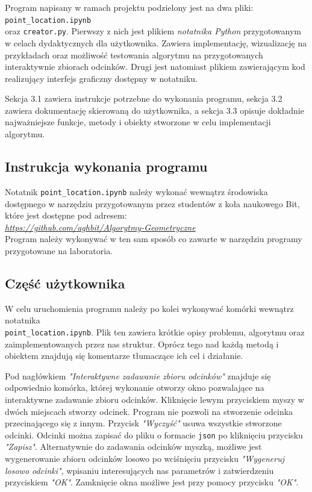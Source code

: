 \documentclass[11pt,a4paper]{article}
\begin{document}
Program napisany w ramach projektu podzielony jest
na dwa pliki: \verb|point_location.ipynb| \\
oraz \verb|creator.py|. Pierwszy z nich jest plikiem
\textit{notatnika Python} przygotowanym w celach dydaktycznych
dla użytkownika. Zawiera implementację, wizualizację na przykładach 
oraz możliwość testowania algorytmu na przygotowanych interaktywnie
zbiorach odcinków. Drugi jest natomiast plikiem
zawierającym kod realizujący interfejs graficzny dostępny w notatniku.

Sekcja 3.1 zawiera instrukcje potrzebne do wykonania programu,
sekcja 3.2 zawiera dokumentację skierowaną do użytkownika, %
a sekcja 3.3 opisuje dokładnie najważniejsze funkcje, metody
i obiekty stworzone w celu implementacji algorytmu.

\subsection{Instrukcja wykonania programu}
Notatnik \verb|point_location.ipynb| należy wykonać
wewnątrz środowiska dostępnego w narzędziu 
przygotowanym przez studentów z koła naukowego Bit, 
które jest dostępne pod adresem:
\\
\emph{\hyperlink{https://github.com/aghbit/Algorytmy-Geometryczne}
{https://github.com/aghbit/Algorytmy-Geometryczne}}
\\
Program należy wykonywać w ten sam sposób co
zawarte w narzędziu programy przygotowane na laboratoria.

\subsection{Część użytkownika}
W celu uruchomienia programu należy po kolei
wykonywać komórki wewnątrz notatnika \\
\verb|point_location.ipynb|. Plik ten zawiera
krótkie opisy problemu, algorytmu oraz zaimplementowanych
przez nas struktur. Oprócz tego nad każdą metodą i obiektem
znajdują się komentarze tłumaczące ich cel i działanie.

Pod nagłówkiem \emph{"Interaktywne zadawanie zbioru odcinków"}
znajduje się odpowiednio komórka, której wykonanie otworzy
okno pozwalające na interaktywne zadawanie zbioru odcinków.
Kliknięcie lewym przyciskiem myszy w dwóch miejscach stworzy odcinek. 
Program nie pozwoli na stworzenie odcinka przecinającego się z innym.
Przycisk \emph{"Wyczyść"} usuwa wszystkie stworzone odcinki.
Odcinki można zapisać do pliku o formacie \verb|json| po kliknięciu
przycisku \emph{"Zapisz"}. Alternatywnie do zadawania odcinków myszką,
możliwe jest wygenerowanie zbioru odcinków losowo po wciśnięciu
przycisku \emph{"Wygeneruj losowo odcinki"}, wpisaniu interesujących
nas parametrów i zatwierdzeniu przyciskiem \emph{"OK"}. Zamknięcie
okna możliwe jest przy pomocy przycisku \emph{"OK"}.
\end{document}
